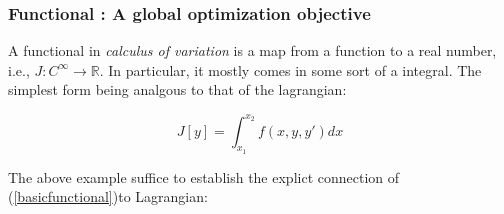 \subsubsection{Functional : A global optimization objective}

A functional in \textit{calculus of variation} is a map from a function to a real number, i.e., $J:C^{\infty} \to \mathbb{R}$. In particular, it mostly comes in some sort of a integral. The simplest form being analgous to that of the lagrangian:

\begin{equation}
\label{basicfunctional}
J[y] = \int_{x_1}^{x_2} f(x,y,y')dx
\end{equation}

The above example suffice to establish the explict connection of (\ref{basicfunctional})to Lagrangian:

